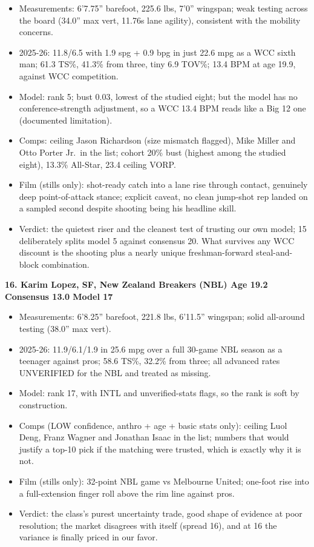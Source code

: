 \documentclass[
  10pt,
]{article}
\providecommand{\tightlist}{%
  \setlength{\itemsep}{0pt}\setlength{\parskip}{0pt}}
\begin{document}
\begin{itemize}
\tightlist
\item
  Measurements: 6'7.75'' barefoot, 225.6 lbs, 7'0'' wingspan; weak testing
  across the board (34.0'' max vert, 11.76s lane agility), consistent with the
  mobility concerns.
\item
  2025-26: 11.8/6.5 with 1.9 spg + 0.9 bpg in just 22.6 mpg as a WCC sixth man;
  61.3 TS\%, 41.3\% from three, tiny 6.9 TOV\%; 13.4 BPM at age 19.9, against
  WCC competition.
\item
  Model: rank 5; bust 0.03, lowest of the studied eight; but the model has no
  conference-strength adjustment, so a WCC 13.4 BPM reads like a Big 12 one
  (documented limitation).
\item
  Comps: ceiling Jason Richardson (size mismatch flagged), Mike Miller and Otto
  Porter Jr.~in the list; cohort 20\% bust (highest among the studied eight),
  13.3\% All-Star, 23.4 ceiling VORP.
\item
  Film (stills only): shot-ready catch into a lane rise through contact,
  genuinely deep point-of-attack stance; explicit caveat, no clean jump-shot rep
  landed on a sampled second despite shooting being his headline skill.
\item
  Verdict: the quietest riser and the cleanest test of trusting our own model;
  15 deliberately splits model 5 against consensus 20. What survives any WCC
  discount is the shooting plus a nearly unique freshman-forward steal-and-block
  combination.
\end{itemize}

\textbf{16. Karim Lopez, SF, New Zealand Breakers (NBL) \textbar{} Age 19.2
\textbar{} Consensus 13.0 \textbar{} Model 17}

\begin{itemize}
\tightlist
\item
  Measurements: 6'8.25'' barefoot, 221.8 lbs, 6'11.5'' wingspan; solid
  all-around testing (38.0'' max vert).
\item
  2025-26: 11.9/6.1/1.9 in 25.6 mpg over a full 30-game NBL season as a teenager
  against pros; 58.6 TS\%, 32.2\% from three; all advanced rates UNVERIFIED for
  the NBL and treated as missing.
\item
  Model: rank 17, with INTL and unverified-stats flags, so the rank is soft by
  construction.
\item
  Comps (LOW confidence, anthro + age + basic stats only): ceiling Luol Deng,
  Franz Wagner and Jonathan Isaac in the list; numbers that would justify a
  top-10 pick if the matching were trusted, which is exactly why it is not.
\item
  Film (stills only): 32-point NBL game vs Melbourne United; one-foot rise into
  a full-extension finger roll above the rim line against pros.
\item
  Verdict: the class's purest uncertainty trade, good shape of evidence at poor
  resolution; the market disagrees with itself (spread 16), and at 16 the
  variance is finally priced in our favor.
\end{itemize}
\end{document}
